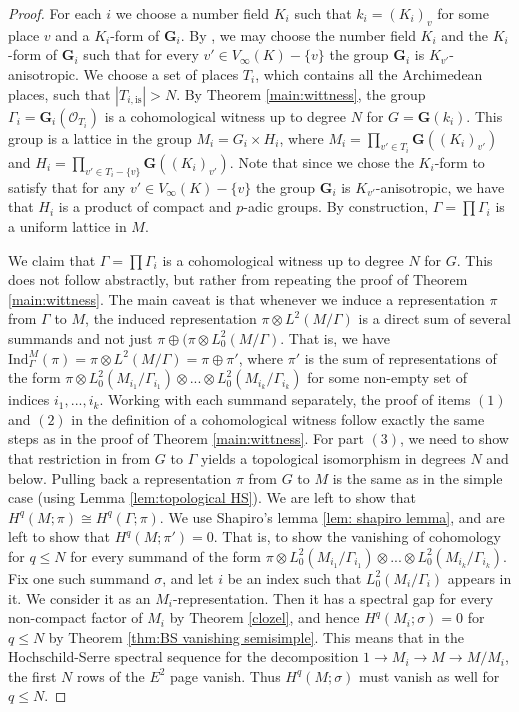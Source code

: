 \documentclass[12pt,reqno]{amsart}
\theoremstyle{definition}
\newcommand{\abs}[1]{\left| #1 \right|}
\begin{document}
\begin{proof}
    For each $i$ we choose a number field $K_i$ such that $k_i=(K_i)_v$ for some place $v$ and a $K_i$-form of $\mathbf{G}_i$. By \cite[Corollary~1.12]{BorelHarder}, we may choose the number field $K_i$ and the $K_i$-form of $\mathbf{G}_i$ such that for every $v' \in V_\infty(K)-\{v\}$ the group $\mathbf{G}_i$ is $K_{v'}$-anisotropic. We choose a set of places $T_i$, which contains all the Archimedean places, such that $\abs{T_{i,\mathrm{is}}} > N$. By Theorem \ref{main:wittness}, the group $\Gamma_i=\mathbf{G}_i(\mathcal O_{T_i})$ is a cohomological witness up to degree $N$ for $G=\mathbf{G}(k_i)$. This group is a lattice in the group $M_i=G_i \times H_i$, where $M_i=\prod_{v' \in T_i} \mathbf{G}((K_i)_{v'})$ and $H_i=\prod_{v' \in T_i - \{v\}} \mathbf{G}((K_i)_{v'})$. Note that since we chose the $K_i$-form to satisfy that for any $v' \in V_\infty(K)-\{v\}$ the group $\mathbf{G}_i$ is $K_{v'}$-anisotropic, we have that $H_i$ is a product of compact and $p$-adic groups. By construction, $\Gamma=\prod \Gamma_i$ is a uniform lattice in $M$.

    We claim that $\Gamma=\prod \Gamma_i$ is a cohomological witness up to degree $N$ for $G$. This does not follow abstractly, but rather from repeating the proof of Theorem \ref{main:wittness}. The main caveat is that whenever we induce a representation $\pi$ from $\Gamma$ to $M$, the induced representation $\pi \otimes L^2(M/\Gamma)$ is a direct sum of several summands and not just $\pi \oplus (\pi \otimes L^2_0(M/ \Gamma)$. That is, we have $\mathrm{Ind}_\Gamma^M(\pi)=\pi \otimes L^2(M/\Gamma)=\pi \oplus \pi'$, where $\pi'$ is the sum of representations of the form $\pi \otimes L^2_0(M_{i_1}/\Gamma_{i_1}) \otimes ... \otimes L^2_0(M_{i_k}/\Gamma_{i_k})$ for some non-empty set of indices $i_1, ... , i_k$. Working with each summand separately, the proof of items $(1)$ and $(2)$ in the definition of a cohomological witness follow exactly the same steps as in the proof of Theorem \ref{main:wittness}. For part $(3)$, we need to show that restriction in from $G$ to $\Gamma$ yields a topological isomorphism in degrees $N$ and below. Pulling back a representation $\pi$ from $G$ to $M$ is the same as in the simple case (using Lemma \ref{lem:topological HS}). We are left to show that $H^q(M;\pi) \cong H^q(\Gamma;\pi)$. We use Shapiro's lemma \ref{lem: shapiro lemma}, and are left to show that $H^q(M;\pi')=0$. That is, to show the vanishing of cohomology for $q \leq N$ for every summand of the form  $\pi \otimes L^2_0(M_{i_1}/\Gamma_{i_1}) \otimes ... \otimes L^2_0(M_{i_k}/\Gamma_{i_k})$. Fix one such summand $\sigma$, and let $i$ be an index such that $L^2_0(M_i / \Gamma_i)$ appears in it. We consider it as an $M_i$-representation. Then it has a spectral gap for every non-compact factor of $M_i$ by Theorem \ref{clozel}, and hence $H^q(M_i;\sigma)=0$ for $q \leq N$ by Theorem \ref{thm:BS vanishing semisimple}. This means that in the Hochschild-Serre spectral sequence for the decomposition $1 \to M_i \to M \to M/M_i$, the first $N$ rows of the $E^2$ page vanish. Thus $H^q(M;\sigma)$ must vanish as well for $q \leq N$. 
\end{proof}
\end{document}
